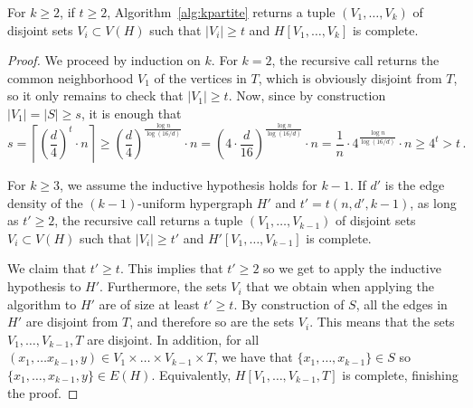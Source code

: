 \begin{theorem}
    For $k \geq 2$, if $t \geq 2$, Algorithm~\ref{alg:kpartite} returns a tuple $(V_1, \dots, V_k)$ of disjoint sets $V_i \subset V(H)$ such that
    $|V_i| \geq t$ and $H[V_1, \dots, V_k]$ is complete.

    \begin{proof}
        We proceed by induction on $k$.
        For $k=2$, the recursive call returns the common neighborhood $V_1$ of the vertices in $T$,
        which is obviously disjoint from $T$, so it only remains to check that $|V_1| \geq t$.
        Now, since by construction $|V_1| = |S| \geq s$, it is enough that
        \[
            s
            = \left\lceil \left( \frac{d}{4} \right)^t \cdot n \right\rceil
            \geq \left( \frac{d}{4} \right)^{\frac{\log n}{\log(16/d)}}  \cdot n
            = \left( 4 \cdot \frac{d}{16} \right)^{\frac{\log n}{\log(16/d)}} \cdot n
            = \frac{1}{n} \cdot 4^{\frac{\log n}{\log(16/d)}} \cdot n
            \geq 4^t
            > t\,.
        \]

        For $k \geq 3$, we assume the inductive hypothesis holds for $k-1$.
        If $d'$ is the edge density of the $(k-1)$-uniform hypergraph $H'$
        and $t' = t(n, d', k-1)$, as long as $t' \geq 2$, the recursive call returns
        a tuple $(V_1, \dots, V_{k-1})$ of disjoint sets $V_i \subset V(H)$ such that
        $|V_i| \geq t'$ and $H'[V_1, \dots, V_{k-1}]$ is complete.

        We claim that $t' \geq t$.
        This implies that $t' \geq 2$ so we get to apply the inductive hypothesis to $H'$.
        Furthermore, the sets $V_i$ that we obtain when applying the algorithm to $H'$
        are of size at least $t' \geq t$.
        By construction of $S$, all the edges in $H'$ are disjoint from $T$,
        and therefore so are the sets $V_i$.
        This means that the sets $V_1, \dots, V_{k-1}, T$ are disjoint.
        In addition, for all $(x_1, \dots x_{k-1}, y) \in V_1 \times \dots \times V_{k-1} \times T$,
        we have that $\{x_1, \dots, x_{k-1}\} \in S$ so $\{x_1, \dots, x_{k-1}, y\} \in E(H)$.
        Equivalently, $H[V_1, \dots, V_{k-1}, T]$ is complete, finishing the proof.


\end{proof}
\end{theorem}
